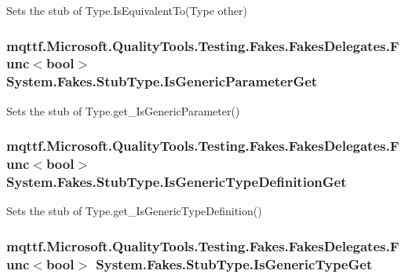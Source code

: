 Sets the stub of Type.\-Is\-Equivalent\-To(\-Type other)

\hypertarget{class_system_1_1_fakes_1_1_stub_type_aadc0de58c8ac5accd4e4cf1baf2b6608}{
\subsubsection[{Is\-Generic\-Parameter\-Get}]{\setlength{\rightskip}{0pt plus 5cm}mqttf.\-Microsoft.\-Quality\-Tools.\-Testing.\-Fakes.\-Fakes\-Delegates.\-Func$<$bool$>$ System.\-Fakes.\-Stub\-Type.\-Is\-Generic\-Parameter\-Get}}\label{class_system_1_1_fakes_1_1_stub_type_aadc0de58c8ac5accd4e4cf1baf2b6608}


Sets the stub of Type.\-get\-\_\-\-Is\-Generic\-Parameter()

\hypertarget{class_system_1_1_fakes_1_1_stub_type_afd91c14843317d6b6c0dc3d4ced2c307}{
\subsubsection[{Is\-Generic\-Type\-Definition\-Get}]{\setlength{\rightskip}{0pt plus 5cm}mqttf.\-Microsoft.\-Quality\-Tools.\-Testing.\-Fakes.\-Fakes\-Delegates.\-Func$<$bool$>$ System.\-Fakes.\-Stub\-Type.\-Is\-Generic\-Type\-Definition\-Get}}\label{class_system_1_1_fakes_1_1_stub_type_afd91c14843317d6b6c0dc3d4ced2c307}


Sets the stub of Type.\-get\-\_\-\-Is\-Generic\-Type\-Definition()

\hypertarget{class_system_1_1_fakes_1_1_stub_type_a0be3601a91cc57e566feb9cade4a2999}{
\subsubsection[{Is\-Generic\-Type\-Get}]{\setlength{\rightskip}{0pt plus 5cm}mqttf.\-Microsoft.\-Quality\-Tools.\-Testing.\-Fakes.\-Fakes\-Delegates.\-Func$<$bool$>$ System.\-Fakes.\-Stub\-Type.\-Is\-Generic\-Type\-Get}}\label{class_system_1_1_fakes_1_1_stub_type_a0be3601a91cc57e566feb9cade4a2999}


